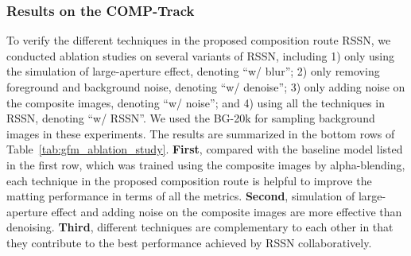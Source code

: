 \documentclass[twocolumn]{svjour3}
\begin{document}
\subsubsection{Results on the COMP-Track} 
To verify the different techniques in the proposed composition route RSSN, we conducted ablation studies on several variants of RSSN, including 1) only using the simulation of large-aperture effect, denoting ``w/ blur''; 2) only removing foreground and background noise, denoting ``w/ denoise''; 3) only adding noise on the composite images, denoting ``w/ noise''; and 4) using all the techniques in RSSN, denoting ``w/ RSSN''. We used the BG-20k for sampling background images in these experiments. The results are summarized in the bottom rows of Table~\ref{tab:gfm_ablation_study}. \textbf{First}, compared with the baseline model listed in the first row, which was trained using the composite images by alpha-blending, each technique in the proposed composition route is helpful to improve the matting performance in terms of all the metrics. \textbf{Second}, simulation of large-aperture effect and adding noise on the composite images are more effective than denoising. \textbf{Third}, different techniques are complementary to each other in that they contribute to the best performance achieved by RSSN collaboratively.


\begin{table}[htbp]
\caption{Results of GFM using different RoSTa and two RoSTa integration techniques on AM-2k.}
\begin{center}
\end{center}
\label{tab:ensemble}
\end{table}
\end{document}
